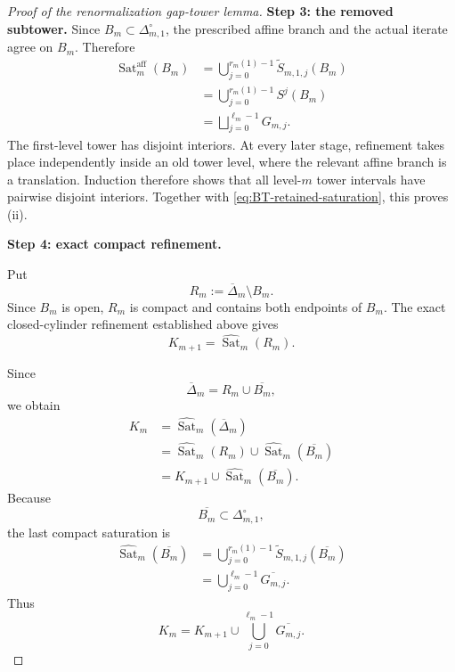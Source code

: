 \documentclass[11pt]{amsart}
\theoremstyle{plain}
\theoremstyle{definition}
\theoremstyle{remark}
\begin{document}
\begin{proof}[Proof of the renormalization gap-tower lemma]
\smallskip
\noindent
\textbf{Step 3: the removed subtower.}
Since \(B_m\subset\Delta_{m,1}^{\circ}\), the prescribed affine branch and the
actual iterate agree on \(B_m\). Therefore
\[
\begin{aligned}
\operatorname{Sat}^{\mathrm{aff}}_m(B_m)
&=
\bigcup_{j=0}^{r_m(1)-1}
\widetilde S_{m,1,j}(B_m)\\
&=
\bigcup_{j=0}^{r_m(1)-1}S^j(B_m)\\
&=
\bigsqcup_{j=0}^{\ell_m-1}G_{m,j}.
\end{aligned}
\]
The first-level tower has disjoint interiors. At every later stage, refinement takes place
independently inside an old tower level, where the relevant affine branch is a translation.
Induction therefore shows that all level-\(m\) tower intervals have pairwise disjoint
interiors. Together with \eqref{eq:BT-retained-saturation}, this proves \textup{(ii)}.

\smallskip
\noindent
\textbf{Step 4: exact compact refinement.}

Put
\[
        R_m
        :=
        \overline{\Delta}_m\setminus B_m.
\]
Since \(B_m\) is open, \(R_m\) is compact and contains both endpoints
of \(B_m\). The exact closed-cylinder refinement established above gives
\[
        K_{m+1}
        =
        \widehat{\operatorname{Sat}}_m(R_m).
\tag{C.4}
\label{eq:BT-compact-retained-saturation}
\]

Since
\[
        \overline{\Delta}_m
        =
        R_m\cup\overline{B_m},
\]
we obtain
\[
\begin{aligned}
        K_m
        &=
        \widehat{\operatorname{Sat}}_m
        (\overline{\Delta}_m)\\
        &=
        \widehat{\operatorname{Sat}}_m(R_m)
        \cup
        \widehat{\operatorname{Sat}}_m(\overline{B_m})\\
        &=
        K_{m+1}
        \cup
        \widehat{\operatorname{Sat}}_m(\overline{B_m}).
\end{aligned}
\]
Because
\[
        \overline{B_m}\subset\Delta_{m,1}^{\circ},
\]
the last compact saturation is
\[
\begin{aligned}
        \widehat{\operatorname{Sat}}_m(\overline{B_m})
        &=
        \bigcup_{j=0}^{r_m(1)-1}
        \widetilde S_{m,1,j}(\overline{B_m})\\
        &=
        \bigcup_{j=0}^{\ell_m-1}
        \overline{G_{m,j}}.
\end{aligned}
\]
Thus
\[
        K_m
        =
        K_{m+1}
        \cup
        \bigcup_{j=0}^{\ell_m-1}
        \overline{G_{m,j}}.
\tag{C.5}
\label{eq:BT-closed-tower-refinement}
\]


\end{proof}
\end{document}
